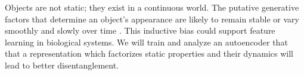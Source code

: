 \documentclass[10pt,letterpaper]{article}
\begin{document}
Objects are not static; they exist in a continuous world. The putative generative factors that determine an object’s appearance are likely to remain stable or vary smoothly and slowly over time \cite{Wiskott2002}. This inductive bias could support feature learning in biological systems. We will train and analyze an autoencoder that that a representation which factorizes static properties and their dynamics will lead to better disentanglement.

\bigskip



\setlength{\bibleftmargin}{.125in}
\setlength{\bibindent}{-\bibleftmargin}

\end{document}
